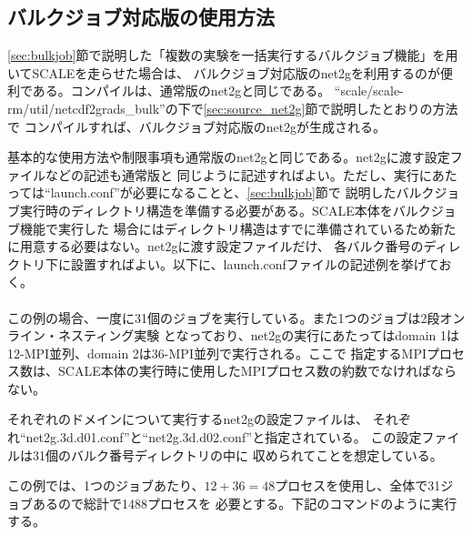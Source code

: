 \subsection{バルクジョブ対応版の使用方法}

\ref{sec:bulkjob}節で説明した「複数の実験を一括実行するバルクジョブ機能」を用いてSCALEを走らせた場合は、
バルクジョブ対応版のnet2gを利用するのが便利である。コンパイルは、通常版のnet2gと同じである。
``scale/scale-rm/util/netcdf2grads\_bulk''の下で\ref{sec:source_net2g}節で説明したとおりの方法で
コンパイルすれば、バルクジョブ対応版のnet2gが生成される。

基本的な使用方法や制限事項も通常版のnet2gと同じである。net2gに渡す設定ファイルなどの記述も通常版と
同じように記述すればよい。ただし、実行にあたっては``launch.conf''が必要になることと、\ref{sec:bulkjob}節で
説明したバルクジョブ実行時のディレクトリ構造を準備する必要がある。SCALE本体をバルクジョブ機能で実行した
場合にはディレクトリ構造はすでに準備されているため新たに用意する必要はない。net2gに渡す設定ファイルだけ、
各バルク番号のディレクトリ下に設置すればよい。以下に、launch.confファイルの記述例を挙げておく。\\

\\

\noindent この例の場合、一度に31個のジョブを実行している。また1つのジョブは2段オンライン・ネスティング実験
となっており、net2gの実行にあたってはdomain 1は12-MPI並列、domain 2は36-MPI並列で実行される。ここで
指定するMPIプロセス数は、SCALE本体の実行時に使用したMPIプロセス数の約数でなければならない。

それぞれのドメインについて実行するnet2gの設定ファイルは、
それぞれ``net2g.3d.d01.conf''と``net2g.3d.d02.conf''と指定されている。
この設定ファイルは31個のバルク番号ディレクトリの中に
収められてことを想定している。

この例では、1つのジョブあたり、$12 + 36 = 48$プロセスを使用し、全体で31ジョブあるので総計で1488プロセスを
必要とする。下記のコマンドのように実行する。


